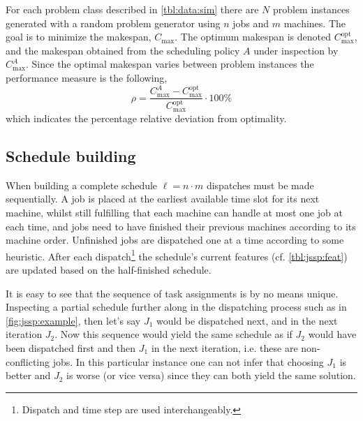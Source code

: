 \documentclass[smallextended]{svjour3}
\begin{document}
For each problem class described in \cref{tbl:data:sim} there are $N$ problem 
instances generated with a random problem generator using $n$ jobs and $m$ 
machines.  The goal is to minimize the makespan, $C_{\max}$. The optimum 
makespan is denoted $C_{\max}^{\text{opt}}$, and the makespan obtained from the 
scheduling policy $A$ under inspection by $C_{\max}^{A}$. Since the optimal 
makespan varies between problem instances the performance measure is the 
following,
\begin{equation}\label{eq:ratio}
    \rho=\frac{C_{\max}^{A}-C_{\max}^{\text{opt}}}{C_{\max}^{\text{opt}}}\cdot
  100\%
\end{equation}
which indicates the percentage relative deviation from optimality. %

\subsection{Schedule building}\label{sec:gen:gametree}
When building a complete schedule $\ell=n\cdot m$ dispatches must be made 
sequentially.  A job is placed at the earliest available time slot for its next 
machine, whilst still fulfilling that each machine can handle at most one job 
at each time, and jobs need to have finished their previous machines according 
to its machine order. Unfinished jobs are dispatched one at a time according to 
some heuristic. After each dispatch\footnote{Dispatch and time step are used 
interchangeably.} the schedule's current features (cf. \cref{tbl:jssp:feat}) 
are updated based on the half-finished schedule.

It is easy to see that the sequence of task assignments is by no means unique. 
Inspecting a partial schedule further along in the dispatching process such as 
in \cref{fig:jssp:example}, then let's say $J_1$ would be dispatched next, and 
in the next iteration $J_2$. Now this sequence would yield the same schedule as 
if $J_2$ would have been dispatched first and then $J_1$ in the next iteration, 
i.e. these are non-conflicting jobs.  In this particular instance one can not 
infer that choosing $J_1$ is better and $J_2$ is worse (or vice versa) since
they can both yield the same solution. 
\end{document}

